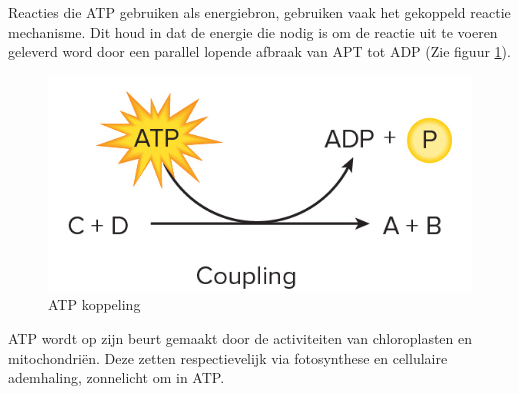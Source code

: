 \documentclass[a4paper,kul]{kulakarticle} %
\begin{document}
Reacties die ATP gebruiken als energiebron, gebruiken vaak het gekoppeld reactie mechanisme. Dit houd in dat de energie die nodig is om de reactie uit te voeren geleverd word door een parallel lopende afbraak van APT tot ADP (Zie figuur \ref{fig:atpcoupeling}). 
\begin{figure}[h]
	\centering
	\includegraphics[width=0.7\linewidth]{ATPCoupeling}
	\caption[ATP Koppeling]{ATP koppeling}
	\label{fig:atpcoupeling}
\end{figure}
ATP wordt op zijn beurt gemaakt door de activiteiten van chloroplasten en mitochondriën. Deze zetten respectievelijk via fotosynthese en cellulaire ademhaling, zonnelicht om in ATP. 
\end{document}

